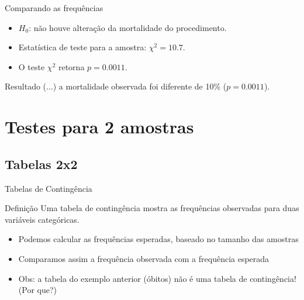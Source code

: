 \documentclass{beamer}
\begin{document}
\begin{frame}{\scriptsize Comparando as frequências}
  \begin{itemize}
    \footnotesize
  \item $H_0$: não houve alteração da mortalidade do procedimento.
  \item Estatística de teste para a amostra: $\chi^2 = 10.7$.
  \item O teste $\chi^2$ retorna $p=0.0011$.
  \end{itemize}
  \bigskip
  \begin{block}{Resultado}
    \small
    (...) a mortalidade observada foi diferente de 10\% ($p=0.0011$).
  \end{block}
\end{frame}

\section[2 amostras]{Testes para 2 amostras}

\subsection{Tabelas 2x2}

\begin{frame}{\scriptsize Tabelas de Contingência}
  \begin{block}{Definição}
    Uma \alert{tabela de contingência} mostra as frequências
    observadas para duas variáveis categóricas.
  \end{block}
  \begin{itemize}
  \item Podemos calcular as frequências esperadas, baseado no tamanho
    das amostras
  \item Comparamos assim a frequência observada com a frequência
    esperada
  \item Obs: a tabela do exemplo anterior (óbitos) \alert{não é} uma
    tabela de contingência! (Por que?)
  \end{itemize}
\end{frame}
\end{document}
